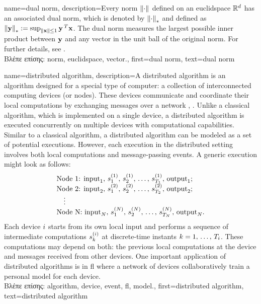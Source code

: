 {name={dual norm},
	description={Every \gls{norm} $\left\Vert {\cdot} \right\Vert_{}$ defined on an \gls{euclidspace} $\mathbb{R}^{d}$ 
		has an associated dual \gls{norm}, which is denoted by $\left\Vert {\cdot} \right\Vert_{*}$ and defined as 
		$\left\Vert {{\bf y}} \right\Vert_{*} := \sup_{\Vert {{\bf x}} \Vert{} \le 1} {\bf y}\,^{T} {\bf x}$. 
		The dual \gls{norm} measures the largest possible inner product between ${\bf y}$ 
		and any \gls{vector} in the unit ball of the original \gls{norm}. For further details, see 
		\cite[Sec.~A.1.6]{BoydConvexBook}.\\
		\foreignlanguage{greek}{Βλέπε επίσης:} \gls{norm}, \gls{euclidspace}, \gls{vector}.},
	first={dual norm},
	text={dual norm}
}

{name={distributed algorithm},
	description={A distributed \gls{algorithm} is an \gls{algorithm} designed for 
		a special type of computer: a collection of interconnected computing devices (or nodes). 
		These devices communicate and coordinate their local computations by exchanging 
		messages over a network \cite{IntroDistAlg}, \cite{ParallelDistrBook}. Unlike a classical \gls{algorithm}, 
		which is implemented on a single \gls{device}, a distributed \gls{algorithm} is 
		executed concurrently on multiple \gls{device}s with computational capabilities. 
		Similar to a classical \gls{algorithm}, a distributed \gls{algorithm} can be modeled as a 
		set of potential executions. However, each execution in the distributed setting involves 
		both local computations and message-passing \gls{event}s. A generic execution might look as 
		follows:
		\[
		\begin{array}{l}
			\text{Node 1: } {\rm input}_1, \,s_1^{(1)}, \,s_2^{(1)}, \,\ldots, \,s_{T_1}^{(1)}, \,{\rm output}_1; \\
			\text{Node 2: } {\rm input}_2, \,s_1^{(2)}, \,s_2^{(2)}, \,\ldots, \,s_{T_2}^{(2)}, \,{\rm output}_2; \\
			\quad \vdots \\
			\text{Node N: } {\rm input}_N, \,s_1^{(N)}, \,s_2^{(N)}, \,\ldots, \,s_{T_N}^{(N)}, \,{\rm output}_N.
		\end{array}
		\]
		Each \gls{device} $i$ starts from its own local input and performs a sequence of 
		intermediate computations $s_{k}^{(i)}$ at discrete-time instants $k = 1, \,\dots, \,T_i$. 
		These computations may depend on both: the previous local computations at the \gls{device} 
		and messages received from other \gls{device}s. One important application of distributed 
		\gls{algorithm}s is in \gls{fl} where a network of \gls{device}s collaboratively train a personal \gls{model} 
		for each \gls{device}.\\
		\foreignlanguage{greek}{Βλέπε επίσης:} \gls{algorithm}, \gls{device}, \gls{event}, \gls{fl}, \gls{model}.},
	first={distributed algorithm}, 
	text={distributed algorithm}
}

